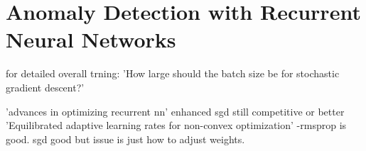 
\chapter[]{Anomaly Detection with Recurrent Neural Networks}


for detailed overall trning: 'How large should the batch size be for stochastic gradient descent?'


'advances in optimizing recurrent nn' enhanced sgd still competitive or better
'Equilibrated adaptive learning rates for non-convex optimization' -rmsprop is good. sgd good but issue is just how to adjust weights.


